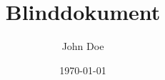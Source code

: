 
\usepackage[ngerman]{babel}
\usepackage{blindtext}
\usepackage[hidelinks]{hyperref}

\title{Blinddokument}
\author{John Doe}
\date{\today%
}